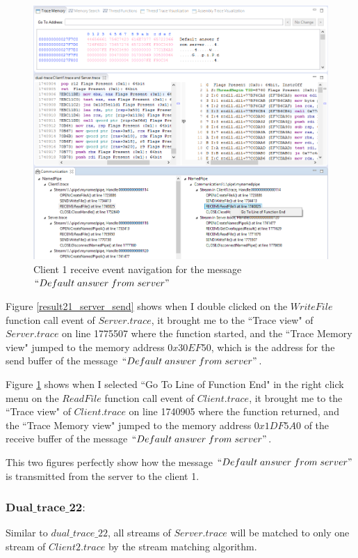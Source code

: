 \begin{figure}
\includegraphics[width=\textwidth]{Figures/result21_client_read}
 \caption{Client 1 receive event navigation for the message $``Default\; answer\; from\; server"$}
\label{result21_client_read}
\end{figure}

Figure \ref{result21_server_send} shows when I double clicked on the $WriteFile$ function call event of $Server.trace$, it brought me to the ``Trace view" of $Server.trace$ on line 1775507 where the function started, and the ``Trace Memory view" jumped to the memory address $0x30EF50$, which is the address for the send buffer of the message $``Default\; answer\; from\; server"$.

Figure \ref{result21_client_read} shows when I selected ``Go To Line of Function End" in the right click menu on the $ReadFile$ function call event of $Client.trace$, it brought me to the ``Trace view" of $Client.trace$ on line 1740905 where the function returned, and the ``Trace Memory view" jumped to the memory address $0x1DF5A0$ of the receive buffer of the message $``Default\; answer\; from\; server"$.

This two figures perfectly show how the message $``Default\; answer\; from\; server"$ is transmitted from the server to the client 1.

\subsubsection{$\boldsymbol{Dual\_trace\_22:}$}
Similar to $dual\_trace\_22$, all streams of $Server.trace$ will be matched to only one stream of $Client2.trace$ by the stream matching algorithm.

